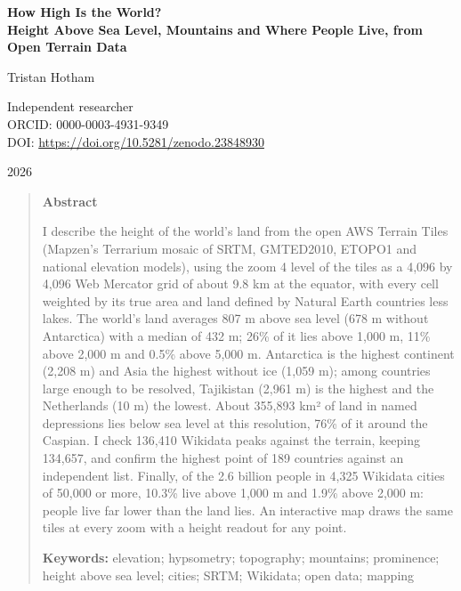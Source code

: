 \documentclass[11pt,a4paper]{article}
\begin{document}
\begin{center}
{\Large\bfseries How High Is the World?\\[2pt] Height Above Sea Level, Mountains and Where People Live, from Open Terrain Data\par}
\vspace{1.2em}
{\large Tristan Hotham\par}
\vspace{0.3em}
{\small Independent researcher\\
ORCID: 0000-0003-4931-9349\\
DOI: \url{https://doi.org/10.5281/zenodo.23848930}\par}
\vspace{0.8em}
2026
\end{center}

\begin{quote}
\small
\begin{center}\textbf{Abstract}\end{center}
I describe the height of the world's land from the open AWS Terrain Tiles (Mapzen's Terrarium mosaic of SRTM, GMTED2010, ETOPO1 and national elevation models), using the zoom 4 level of the tiles as a 4,096 by 4,096 Web Mercator grid of about 9.8 km at the equator, with every cell weighted by its true area and land defined by Natural Earth countries less lakes. The world's land averages 807 m above sea level (678 m without Antarctica) with a median of 432 m; 26\% of it lies above 1,000 m, 11\% above 2,000 m and 0.5\% above 5,000 m. Antarctica is the highest continent (2,208 m) and Asia the highest without ice (1,059 m); among countries large enough to be resolved, Tajikistan (2,961 m) is the highest and the Netherlands (10 m) the lowest. About 355,893 km² of land in named depressions lies below sea level at this resolution, 76\% of it around the Caspian. I check 136,410 Wikidata peaks against the terrain, keeping 134,657, and confirm the highest point of 189 countries against an independent list. Finally, of the 2.6 billion people in 4,325 Wikidata cities of 50,000 or more, 10.3\% live above 1,000 m and 1.9\% above 2,000 m: people live far lower than the land lies. An interactive map draws the same tiles at every zoom with a height readout for any point.

\textbf{Keywords:} elevation; hypsometry; topography; mountains; prominence; height above sea level; cities; SRTM; Wikidata; open data; mapping
\end{quote}
\end{document}
